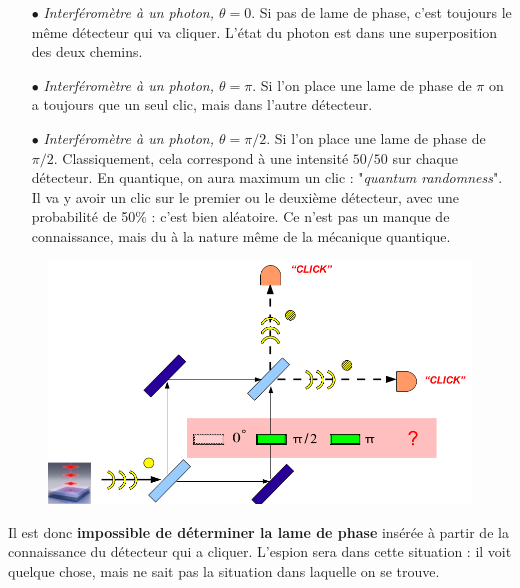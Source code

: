 \begin{itemize}
\item[$\bullet$] \textit{Interféromètre à un photon, $\theta=0$}. Si pas de lame de phase,
c'est toujours le même détecteur qui va cliquer. L'état du photon est dans une superposition
des deux chemins.
\item[$\bullet$] \textit{Interféromètre à un photon, $\theta=\pi$}. Si l'on place une
lame de phase de $\pi$ on a toujours que un seul clic, mais dans l'autre détecteur.
\item[$\bullet$] \textit{Interféromètre à un photon, $\theta=\pi/2$}. Si l'on place une
lame de phase de $\pi/2$. Classiquement, cela correspond à une intensité $50/50$ sur chaque détecteur. 
En quantique, on aura maximum un clic : "\textit{quantum randomness}". Il va y avoir un clic
sur le premier ou le deuxième détecteur, avec une probabilité de 50\% : c'est bien aléatoire. Ce
n'est pas un manque de connaissance, mais du à la nature même de la mécanique quantique.
\end{itemize}

	\begin{figure}
	\vspace{-5mm}
	\includegraphics[scale=0.2]{ch3/image2}
	\end{figure}
Il est donc \textbf{impossible de déterminer la lame de phase} insérée à partir de la connaissance
du détecteur qui a cliquer. L'espion sera dans cette situation : il voit quelque chose, mais ne 
sait pas la situation dans laquelle on se trouve.\\

